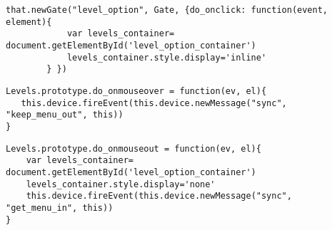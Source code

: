 \begin{lstlisting}[caption=level\_option, label={lst:code5241}]
that.newGate("level_option", Gate, {do_onclick: function(event, element){
            var levels_container= document.getElementById('level_option_container')
            levels_container.style.display='inline'
        } })
\end{lstlisting}

\begin{lstlisting}[caption=do\_onmouseover, label={lst:code5251}]
Levels.prototype.do_onmouseover = function(ev, el){
   this.device.fireEvent(this.device.newMessage("sync", "keep_menu_out", this))
}
\end{lstlisting}

\begin{lstlisting}[caption=do\_onmouseout, label={lst:code5252}]
Levels.prototype.do_onmouseout = function(ev, el){
    var levels_container= document.getElementById('level_option_container')
    levels_container.style.display='none'
    this.device.fireEvent(this.device.newMessage("sync", "get_menu_in", this))
}
\end{lstlisting}